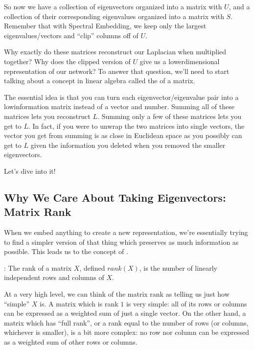 \documentclass[letterpaper,10pt,english]{jupyterBook}
\begin{document}
\noindent{}

\sphinxAtStartPar
So now we have a collection of eigenvectors organized into a matrix with \(U\), and a collection of their corresponding eigenvalues organized into a matrix with \(S\). Remember that with Spectral Embedding, we keep only the largest eigenvalues/vectors and “clip” columns off of \(U\).

\sphinxAtStartPar
Why exactly do these matrices reconstruct our Laplacian when multiplied together? Why does the clipped version of \(U\) give us a lower\sphinxhyphen{}dimensional representation of our network? To answer that question, we’ll need to start talking about a concept in linear algebra called the  of a matrix.

\sphinxAtStartPar
The essential idea is that you can turn each eigenvector/eigenvalue pair into a low\sphinxhyphen{}information matrix instead of a vector and number. Summing all of these matrices lets you reconstruct \(L\). Summing only a few of these matrices lets you get  to \(L\). In fact, if you were to unwrap the two matrices into single vectors, the vector you get from summing is as close in Euclidean space as you possibly can get to \(L\) given the information you deleted when you removed the smaller eigenvectors.

\sphinxAtStartPar
Let’s dive into it!


\subsection{Why We Care About Taking Eigenvectors: Matrix Rank}
\label{\detokenize{representations/ch6/spectral-embedding:why-we-care-about-taking-eigenvectors-matrix-rank}}
\sphinxAtStartPar
When we embed anything to create a new representation, we’re essentially trying to find a simpler version of that thing which preserves as much information as possible. This leads us to the concept of .

\sphinxAtStartPar
{}: The rank of a matrix \(X\), defined \(rank(X)\), is the number of linearly independent rows and columns of \(X\).

\sphinxAtStartPar
At a very high level, we can think of the matrix rank as telling us just how “simple” \(X\) is. A matrix which is rank \(1\) is very simple: all of its rows or columns can be expressed as a weighted sum of just a single vector. On the other hand, a matrix which has “full rank”, or a rank equal to the number of rows (or columns, whichever is smaller), is a bit more complex: no row nor column can be expressed as a weighted sum of other rows or columns.
\end{document}
